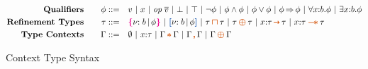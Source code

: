 \begin{figure}[h]
  { \small
  \vspace{-10pt}
    \begin{alignat*}{2}
      \text{\textbf{Qualifiers}}& \quad & \phi ::= \quad & v ~|~ x ~|~ \primop\;\overline{v} ~|~ \bot ~|~ \top  ~|~ \neg \phi ~|~ \phi \land \phi ~|~ \phi \lor \phi ~|~  \phi \impl \phi ~|~ \forall x{:}b. \phi ~|~ \exists x{:}b. \phi
      \\ \text{\textbf{Refinement Types}}& \quad & \tau ::= \quad &
      \ort{b}{\phi} ~|~ \urt{b}{\phi} ~|~ \tau \ctinter \tau ~|~ \tau
      \ctoplus \tau ~|~ x{:}\tau \ctsarr \tau ~|~ x{:}\tau \ctwand
      \tau %
      \\ \text{\textbf{Type Contexts}}& \quad & \Gamma ::= \quad & \emptyset ~|~ x{:}\tau ~|~ \Gamma \ctstar \Gamma ~|~ \Gamma \ctcomma \Gamma ~|~ \Gamma \ctoplus \Gamma
    \end{alignat*}}
  \vspace{-18pt}
  \caption{Context Type Syntax}
  \label{fig:context-types-syntax}
  \vspace{-6pt}
\end{figure}

